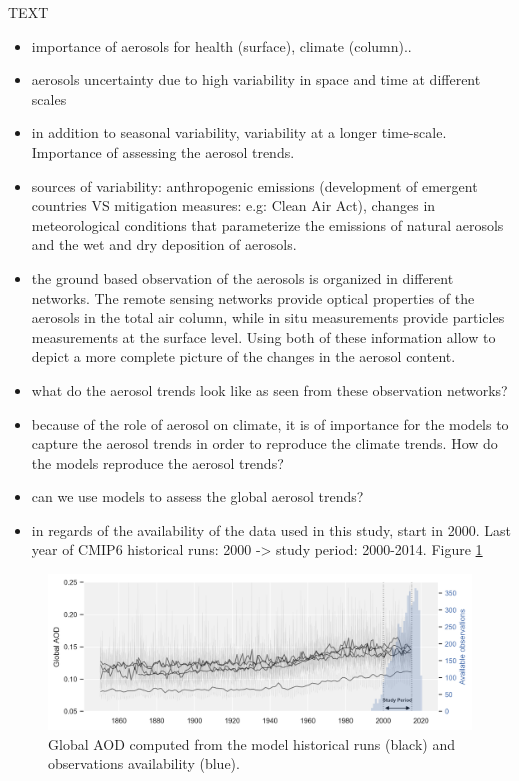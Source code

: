 \documentclass[journal abbreviation, manuscript]{copernicus}
\begin{document}
\introduction  %
TEXT
\begin{itemize}
 \item importance of aerosols for health (surface), climate (column)..
 \item aerosols uncertainty due to high variability in space and time at different scales
 \item in addition to seasonal variability, variability at a longer time-scale. Importance of assessing the aerosol trends.
 \item sources of variability: anthropogenic emissions (development of emergent countries VS mitigation measures: e.g: Clean Air Act), changes in meteorological conditions that parameterize the emissions of natural aerosols and the wet and dry deposition of aerosols.
 \item the ground based observation of the aerosols is organized in different networks. The remote sensing networks provide optical properties of the aerosols in the total air column, while in situ measurements provide particles measurements at the surface level. Using both of these information allow to depict a more complete picture of the changes in the aerosol content.
 \item what do the aerosol trends look like as seen from these observation networks?
 \item because of the role of aerosol on climate, it is of importance for the models to capture the aerosol trends in order to reproduce the climate trends. How do the models reproduce the aerosol trends?
 \item can we use models to assess the global aerosol trends?
 \item in regards of the availability of the data used in this study, start in 2000. Last year of CMIP6 historical runs: 2000 -> study period: 2000-2014. Figure \ref{fig:hist_runs}
\end{itemize}

\begin{figure}
    \centering
    \includegraphics[width=12cm]{../scripts/figs/hist_runs.png}
    \caption{Global AOD computed from the model historical runs (black) and observations availability (blue).}
    \label{fig:hist_runs}
\end{figure}
\end{document}
